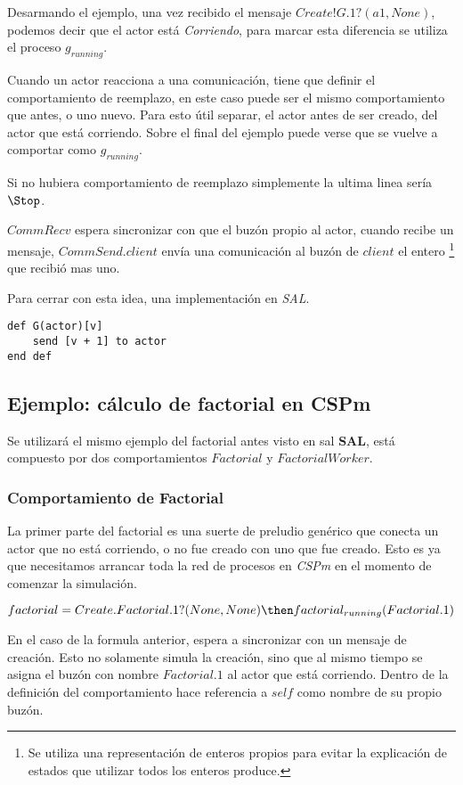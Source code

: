 \documentclass[fleqn]{article}
\begin{document}
Desarmando el ejemplo, una vez recibido el mensaje $Create!G.1?(a1, None)$,
podemos decir que el actor está \textit{Corriendo}, para marcar esta diferencia
se utiliza el proceso $g_{running}$.

Cuando un actor reacciona a una comunicación, tiene que definir el
comportamiento de reemplazo, en este caso puede ser el mismo comportamiento que
antes, o uno nuevo. Para esto útil separar, el actor antes de ser creado, del
actor que está corriendo. Sobre el final del ejemplo puede verse que se vuelve a
comportar como $g_{running}$.

Si no hubiera comportamiento de reemplazo simplemente la ultima linea sería
$\Stop$.

$CommRecv$ espera sincronizar con que el buzón propio al actor, cuando
recibe un mensaje, $CommSend.client$ envía una comunicación al buzón de $client$
el entero \footnote{Se utiliza una representación de enteros
  propios para evitar la explicación de estados que utilizar todos los enteros
  produce.} que recibió mas uno.


Para cerrar con esta idea, una implementación en \textit{SAL}.

\begin{lstlisting}[language=sal, style=simple]
def G(actor)[v]
    send [v + 1] to actor
end def
\end{lstlisting}

\subsection{Ejemplo: cálculo de factorial en CSPm}
Se utilizará el mismo ejemplo del factorial antes visto en sal \textbf{SAL},
está compuesto por dos comportamientos $Factorial$ y $FactorialWorker$.

\subsubsection*{Comportamiento de Factorial}

La primer parte del factorial es una suerte de preludio genérico que conecta un
actor que no está corriendo, o no fue creado con uno que fue creado. Esto es ya que
necesitamos arrancar toda la red de procesos en \textit{CSPm} en el momento de
comenzar la simulación.

\[
factorial = Create.Factorial.1?(None, None) \then factorial_{running}(Factorial.1) 
\]

En el caso de la formula anterior, espera a sincronizar con un mensaje de
creación. Esto no solamente simula la creación, sino que al mismo tiempo se
asigna el buzón con nombre $Factorial.1$ al actor que está corriendo. Dentro de
la definición del comportamiento hace referencia a $self$ como nombre de
su propio buzón.
\end{document}
